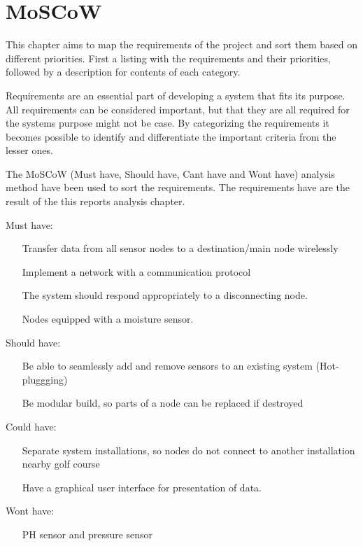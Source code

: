 \chapter{MoSCoW}
This chapter aims to map the requirements of the project and sort them based on different priorities. First a listing with the requirements and their priorities, followed by a description for contents of each category.

Requirements are an essential part of developing a system that fits its purpose. All requirements can be considered important, but that they are all required for the systems purpose might not be case. By categorizing the requirements it becomes possible to identify and differentiate the important criteria from the lesser ones. 

The MoSCoW (Must have, Should have, Cant have and Wont have) analysis method have been used to sort the requirements. The requirements have are the result of the this reports analysis chapter.


Must have:
\begin{itemize}
\item[Transfer data from all sensor nodes to a destination/main node wirelessly]
\item[Implement a network with a communication protocol]
\item[The system should respond appropriately to a disconnecting node.]
\item[Nodes equipped with a moisture sensor.]
\end{itemize}

Should have:
\begin{itemize}
\item[Be able to seamlessly add and remove sensors to an existing system (Hot-pluggging)]
\item[Be modular build, so parts of a node can be replaced if destroyed]
\end{itemize}

Could have:
\begin{itemize}
\item[Separate system installations, so nodes do not connect to another installation nearby golf course]
\item[Have a graphical user interface for presentation of data.]
\end{itemize}

Wont have:
\begin{itemize}
\item[PH sensor and pressure sensor]
\end{itemize}

